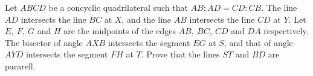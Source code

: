 Let $ABCD$ be a concyclic quadrilateral such that $AB:AD=CD:CB.$ The line $AD$ intersects the line $BC$ at $X$, and the line $AB$ intersects the line $CD$ at $Y$. Let $E,\ F,\ G$ and $H$ are the midpoints of the edges $AB,\ BC,\ CD$ and $DA$ respectively. The bisector of angle $AXB$ intersects the segment $EG$ at $S$, and that of angle $AYD$ intersects the segment $FH$ at $T$. Prove that the lines $ST$ and $BD$ are pararell.